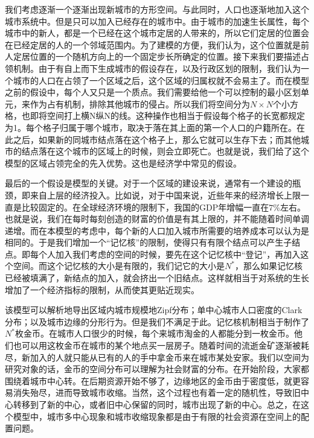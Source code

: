 我们考虑逐渐一个逐渐出现新城市的方形空间。与此同时，人口也逐渐地加入这个城市系统中。但是只可以加入已经存在的城市中。由于城市的加速生长属性，每个城市中的新人，都是一个已经在这个城市定居的人带来的，所以它们定居的位置会在已经定居的人的一个邻域范围内。为了建模的方便，我们认为，这个位置就是前人定居位置的一个随机方向上的一个固定步长所确定的位置。接下来我们要描述占领机制。由于有自上而下生成城市的假设存在，以及行政区划的限制，我们认为一个城市的人口在占领了一个区域之后，这个区域的归属权就不会易主了。而在模型之前的假设中，每个人又只是一个质点。我们需要给他一个可以控制的最小区划单元，来作为占有机制，排除其他城市的侵占。所以我们将空间分为$N\times N$个小方格，也即将空间打上横N纵N的线。这种操作也相当于假设每个格子的长宽都规定为1。每个格子归属于哪个城市，取决于落在其上面的第一个人口的户籍所在。在此之后，如果新的同城市结点落在这个格子上，那么它就可以生存下去；而其他城市的结点落在这个城市的区域上的时候，则会立即死亡。也就是说，我们给了这个模型的区域占领完全的先入优势。这也是经济学中常见的假设。

最后的一个假设是模型的关键。对于一个区域的建设来说，通常有一个建设的瓶颈，即来自上层的经济投入。比如说，对于中国来说，近些年来的经济增长上限一直是比较固定的。在全球经济环境的限制下，我国的GDP年增幅一直在$7\%$左右。也就是说，我们在每时每刻创造的财富的价值是有其上限的，并不能随着时间单调递增。而在本模型的考虑中，每个新的人口加入城市所需要的培养成本可以认为是相同的。于是我们增加一个“记忆核”的限制，使得只有有限个结点可以产生子结点。即每个人加入我们考虑的空间的时候，要先在这个记忆核中“登记”，再加入这个空间。而这个记忆核的大小是有限的，我们记它的大小是$N^*$，那么如果记忆核已经被填满了，新结点的加入，就会挤出一个旧结点。这样就相当于对系统的生长增加了一个经济指标的限制，从而使其更贴近现实。

该模型可以解析地导出区域内城市规模地Zipf分布；单中心城市人口密度的Clark分布；以及城市边缘的分形行为。但是我们不满足于此。记忆核机制相当于制作了$N^*$枚金币。在城市人口很少的时候，每个来城市淘金的人都能分到一枚金币。他们也可以用这枚金币在城市的某个地点买一层房子。随着时间的流逝金矿逐渐被耗尽，新加入的人就只能从已有的人的手中拿金币来在城市某处安家。我们以空间为研究对象的话，金币的空间分布可以理解为社会财富的分布。在开始阶段，大家都围绕着城市中心转。在后期资源开始不够了，边缘地区的金币由于密度低，就更容易消失殆尽，进而导致城市收缩。当然，这个过程也有着一定的随机性，导致旧中心转移到了新的中心，或者旧中心保留的同时，城市出现了新的中心。总之，在这个模型中，城市多中心现象和城市收缩现象都是由于有限的社会资源在空间上的配置问题。